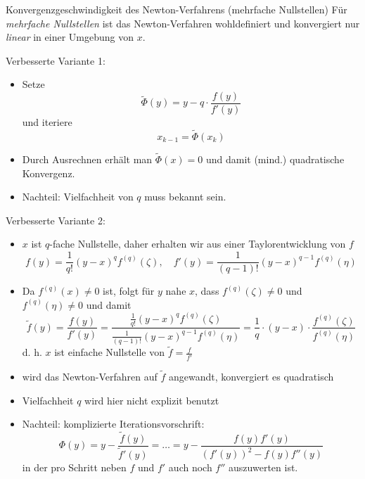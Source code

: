 \begin{defi}{Konvergenzgeschwindigkeit des Newton-Verfahrens (mehrfache Nullstellen)}
    Für \emph{mehrfache Nullstellen} ist das Newton-Verfahren wohldefiniert und konvergiert nur \emph{linear} in einer Umgebung von $x$.

    Verbesserte Variante 1: 
    \begin{itemize}
        \item Setze 
        \[ 
            \tilde{\Phi}(y) = y - q \cdot \frac{f(y)}{f'(y)}
        \]
        und iteriere 
        \[
            x_{k-1} = \tilde{\Phi}(x_k)    
        \]
        \item Durch Ausrechnen erhält man $\tilde{\Phi}(x) = 0$ und damit (mind.) quadratische Konvergenz. 
        \item Nachteil: Vielfachheit von $q$ muss bekannt sein.
    \end{itemize}

    Verbesserte Variante 2:
    \begin{itemize}
        \item $x$ ist $q$-fache Nullstelle, daher erhalten wir aus einer Taylorentwicklung von $f$ 
        \[ 
            f(y) = \frac{1}{q!} (y - x)^q f^{(q)} (\zeta), \quad f'(y) = \frac{1}{(q-1)!} (y - x)^{q-1} f^{(q)} (\eta)
        \]
        \item Da $f^{(q)} (x) \neq 0$ ist, folgt für $y$ nahe $x$, dass $f^{(q)} (\zeta) \neq 0$ und $f^{(q)} (\eta) \neq 0$ und damit 
        \[ 
            \tilde{f} (y) = \frac{f(y)}{f'(y)} = \frac{\frac{1}{q!} (y - x)^q f^{(q)} (\zeta)}{\frac{1}{(q-1)!} (y - x)^{q-1} f^{(q)} (\eta)} = \frac{1}{q} \cdot (y - x) \cdot \frac{f^{(q)} (\zeta)}{f^{(q)} (\eta)}
        \] 
        d. h. $x$ ist einfache Nullstelle von $\tilde{f} = \frac{f}{f'}$
        \item wird das Newton-Verfahren auf $\tilde{f}$ angewandt, konvergiert es quadratisch 
        \item Vielfachheit $q$ wird hier nicht explizit benutzt
        \item Nachteil: komplizierte Iterationsvorschrift: 
        \[
            \Phi(y) = y - \frac{\tilde{f}(y)}{\tilde{f}'(y)} = \ldots = y - \frac{f(y) f'(y)}{\left( f'(y) \right)^2 - f(y) f''(y)}
        \]
        in der pro Schritt neben $f$ und $f'$ auch noch $f''$ auszuwerten ist.
    \end{itemize}
\end{defi}

